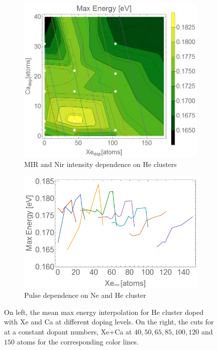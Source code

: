 \begin{figure}[h!]
\hfill
\begin{subfigure}[l]{0.48\textwidth}
\caption{MIR and Nir intensity dependence on He clusters}
\includegraphics[width=1\textwidth]{../Images/results/MIR_He_XeCaDop/interpolationMax.png} 
\end{subfigure} 
\begin{subfigure}[l]{0.48\textwidth}
\caption{Pulse dependence on Ne and He cluster}
\includegraphics[width=1\textwidth]{../Images/results/MIR_He_XeCaDop/interpolationMaxlines.png} 
\end{subfigure} 

\hfill
\caption[Xe-Ca interpolation max energy]{On left, the mean max energy interpolation for He cluster doped with Xe and Ca at different doping levels. On the right, the cuts for at a constant dopant numbers, Xe+Ca at $40,50,65,85,100,120$ and $150$ atoms for the corresponding color lines. }
\label{fig:Xecaenerg}
\end{figure}

